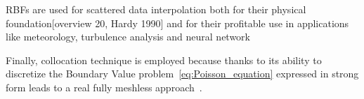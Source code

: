 RBFs are used for scattered data interpolation both for their physical foundation[overview 20, Hardy 1990] and for their profitable use in applications like meteorology, turbulence analysis and neural network~\cite{Chen:meshless_overview_after_20_years}

Finally, collocation technique is employed because thanks to its ability to discretize the Boundary Value problem~\eqref{eq:Poisson_equation} expressed in strong form leads to a real fully meshless approach~\cite{Miotti:RBF_in_depth}.

%
%
%
%
